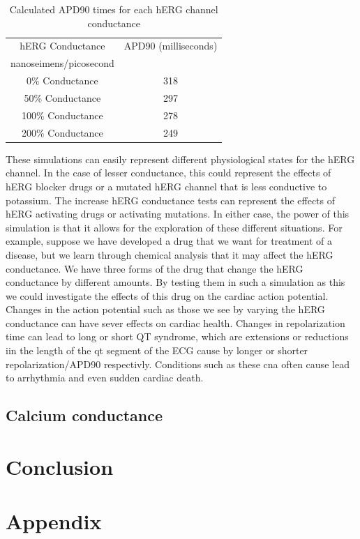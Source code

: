 \documentclass[11pt]{article}
\begin{document}
\begin{table}[H]
	\centering
	\caption{Calculated APD90 times for each hERG channel conductance}
	\label{tab:potassium}
	\begin{tabular}{cc}
		\hline \hline
		hERG Conductance & APD90 (milliseconds)\\ 
		nanoseimens/picosecond &  \\
		\hline
		0\% Conductance & 318\\ 
		50\% Conductance &  297\\ 
		
		100\% Conductance &  278\\ 
		
		200\% Conductance&  249\\ 
		
		
		\hline 
		\hline
	\end{tabular} 
\end{table}
\par{}
These simulations can easily represent different physiological states for the hERG channel. In the case of lesser conductance, this could represent the effects of hERG blocker drugs or a mutated hERG channel that is less conductive to potassium. The increase hERG conductance tests can represent the effects of hERG activating drugs or activating mutations. In either case, the power of this simulation is that it allows for the exploration of these different situations. For example, suppose we have developed a drug that we want for treatment of a disease, but we learn through chemical analysis that it may affect the hERG conductance. We have three forms of the drug that change the hERG conductance by different amounts. By testing them in such a simulation as this we could investigate the effects of this drug on the cardiac action potential. Changes in the action potential such as those we see by varying the hERG conductance can have sever effects on cardiac health. Changes in repolarization time can lead to long or short QT syndrome, which are extensions or reductions iin the length of the qt segment of the ECG cause by longer or shorter repolarization/APD90 respectivly. Conditions such as these cna often cause lead to arrhythmia and even sudden cardiac death. 

\subsection{Calcium conductance}


\section{Conclusion}


\section{Appendix} 





\end{document}

